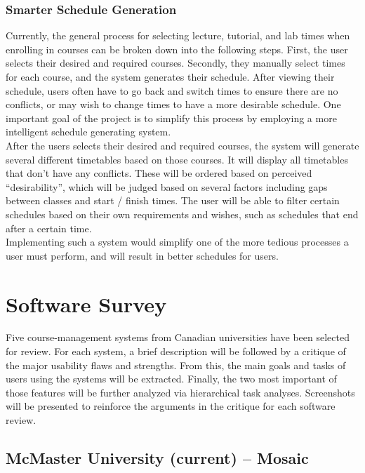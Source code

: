 \documentclass[10pt]{article}
\begin{document}
\begin{multicols}{2}
\subsubsection*{Smarter Schedule Generation}
Currently, the general process for selecting lecture, tutorial, and lab times when enrolling in courses can be broken down into the following steps. First, the user selects their desired and required courses. Secondly, they manually select times for each course, and the system generates their schedule. After viewing their schedule, users often have to go back and switch times to ensure there are no conflicts, or may wish to change times to have a more desirable schedule. One important goal of the project is to simplify this process by employing a more intelligent schedule generating system.\\

After the users selects their desired and required courses, the system will generate several different timetables based on those courses. It will display all timetables that don't have any conflicts. These will be ordered based on perceived ``desirability'', which will be judged based on several factors including gaps between classes and start / finish times. The user will be able to filter certain schedules based on their own requirements and wishes, such as schedules that end after a certain time.\\

Implementing such a system would simplify one of the more tedious processes a user must perform, and will result in better schedules for users.

\section*{Software Survey}
Five course-management systems from Canadian universities have been selected for review. For each system, a brief description will be followed by a critique of the major usability flaws and strengths. From this, the main goals and tasks of users using the systems will be extracted. Finally, the two most important of those features will be further analyzed via hierarchical task analyses. Screenshots will be presented to reinforce the arguments in the critique for each software review.

\subsection*{McMaster University (current) -- Mosaic}


\end{multicols}
\end{document}
